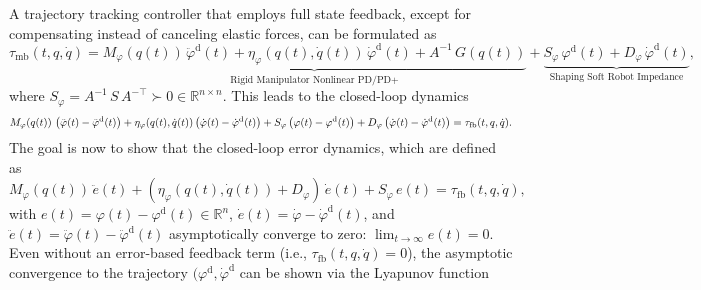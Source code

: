 A trajectory tracking controller that employs full state feedback, except for compensating instead of canceling elastic forces, can be formulated as~\citep{kelly1996class, della2020model}
\begin{equation}
    \tau_\mathrm{mb}(t,q,\dot{q}) = \underbrace{M_\varphi(q(t)) \, \ddot{\varphi}^\mathrm{d}(t) + \eta_\varphi(q(t),\dot{q}(t)) \, \dot{\varphi}^\mathrm{d}(t) + A^{-1} \, G(q(t))}_\text{Rigid Manipulator Nonlinear PD/PD+} + \underbrace{S_\varphi \, \varphi^\mathrm{d}(t) + D_\varphi \, \dot{\varphi}^\mathrm{d}(t)}_\text{Shaping Soft Robot Impedance},
\end{equation}
where $S_\varphi = A^{-1} \, S \, A^{-\top} \succ 0 \in \mathbb{R}^{n \times n}$.
This leads to the closed-loop dynamics
\begin{equation}\footnotesize
    M_\varphi(q(t)) \, \left ( \ddot{\varphi}(t) - \ddot{\varphi}^\mathrm{d}(t) \right ) + \eta_\varphi(q(t),\dot{q}(t)) \left ( \dot{\varphi}(t) - \dot{\varphi}^\mathrm{d}(t) \right ) + S_\varphi \left ( \varphi(t) - \varphi^\mathrm{d}(t) \right ) + D_\varphi \left ( \dot{\varphi}(t) - \dot{\varphi}^\mathrm{d}(t) \right ) = \tau_\mathrm{fb}(t,q,\dot{q}).
\end{equation}
The goal is now to show that the closed-loop error dynamics, which are defined as
\begin{equation}
    M_\varphi(q(t)) \, \ddot{e}(t) + \left ( \eta_\varphi(q(t),\dot{q}(t)) + D_\varphi \right ) \, \dot{e}(t) + S_\varphi \, e(t) = \tau_\mathrm{fb}(t,q,\dot{q}),
\end{equation}
with $e(t) = \varphi(t) - \varphi^\mathrm{d}(t) \in \mathbb{R}^n$, $\dot{e}(t) = \dot{\varphi} - \dot{\varphi}^\mathrm{d}(t)$, and $\ddot{e}(t) = \ddot{\varphi}(t) - \ddot{\varphi}^\mathrm{d}(t)$ asymptotically converge to zero: $\lim_{t \to \infty} e(t) = 0$.
Even without an error-based feedback term (i.e., $\tau_\mathrm{fb}(t,q,\dot{q}) = 0$), the asymptotic convergence to the trajectory $(\varphi^\mathrm{d}, \dot{\varphi}^\mathrm{d}$ can be shown via the Lyapunov function
